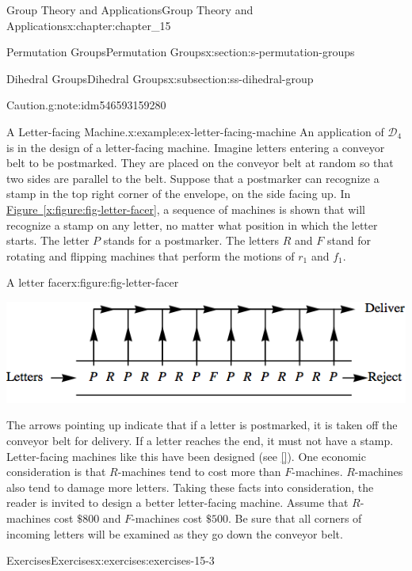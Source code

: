 \documentclass[oneside,10pt,]{book}
\newcommand{\xreffont}{\relax}
\numberwithin{equation}{section}
\begin{document}
\begin{chapterptx}{Group Theory and Applications}{}{Group Theory and Applications}{}{}{x:chapter:chapter_15}
\begin{sectionptx}{Permutation Groups}{}{Permutation Groups}{}{}{x:section:s-permutation-groups}
\begin{subsectionptx}{Dihedral Groups}{}{Dihedral Groups}{}{}{x:subsection:ss-dihedral-group}
\begin{note}{Caution.}{g:note:idm546593159280}
\end{note}
\begin{example}{A Letter-facing Machine.}{x:example:ex-letter-facing-machine}%
An application of \(\mathcal{D}_4\) is in the design of a letter-facing machine.  Imagine letters entering a conveyor belt to be postmarked. They are placed on the conveyor belt at random so that two sides are parallel to the belt. Suppose that a postmarker can recognize a stamp in the top right corner of the envelope, on the side facing up. In \hyperref[x:figure:fig-letter-facer]{Figure~{\xreffont\ref{x:figure:fig-letter-facer}}}, a sequence of machines is shown that will recognize a stamp on any letter, no matter what position in which the letter starts. The letter \(P\) stands for a postmarker. The letters \(R\) and \(F\) stand for rotating and flipping machines that perform the motions of \(r_1\) and \(f_1\).%
\begin{figureptx}{A letter facer}{x:figure:fig-letter-facer}{}%
\begin{image}{0.1}{0.8}{0.1}%
\includegraphics[width=\linewidth]{images/fig-letter-facer.png}
\end{image}%
\tcblower
\end{figureptx}%
The arrows pointing up indicate that if a letter is postmarked, it is taken off the conveyor belt for delivery. If a letter reaches the end, it must not have a stamp. Letter-facing machines like this have been designed (see \hyperlink{x:biblio:biblio-gallian-1977}{[{\xreffont 16}]}). One economic consideration is that \(R\)-machines tend to cost more than \(F\)-machines. \(R\)-machines also tend to damage more letters. Taking these facts into consideration, the reader is invited to design a better letter-facing machine. Assume that \(R\)-machines cost \(\$800\) and \(F\)-machines cost \(\$500\). Be sure that all corners of incoming letters will be examined as they go down the conveyor belt.%
\end{example}
\end{subsectionptx}
%
%
\typeout{************************************************}
\typeout{************************************************}
%
\begin{exercises-subsection}{Exercises}{}{Exercises}{}{}{x:exercises:exercises-15-3}

\end{exercises-subsection}
\end{sectionptx}
\end{chapterptx}
\end{document}
